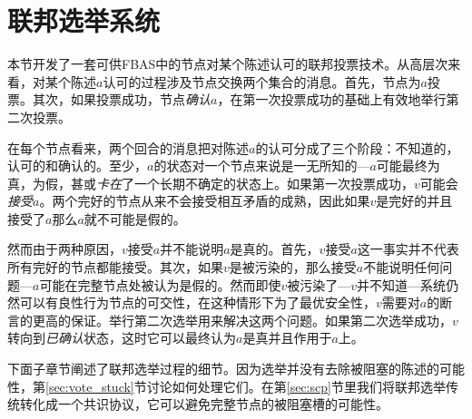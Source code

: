 \section{联邦选举系统}\label{sec:fba}

本节开发了一套可供FBAS中的节点对某个陈述认可的联邦投票技术。从高层次来看，对某个陈述$a$认可的过程涉及节点交换两个集合的消息。首先，节点为$a$投票。其次，如果投票成功，节点\textit{确认}$a$，在第一次投票成功的基础上有效地举行第二次投票。

在每个节点看来，两个回合的消息把对陈述$a$的认可分成了三个阶段：不知道的，认可的和确认的。至少，$a$的状态对一个节点来说是一无所知的---$a$可能最终为真，为假，甚或\textit{卡在}了一个长期不确定的状态上。如果第一次投票成功，$v$可能会\textit{接受}$a$。两个完好的节点从来不会接受相互矛盾的成熟，因此如果$v$是完好的并且接受了$a$那么$a$就不可能是假的。

然而由于两种原因，$v$接受$a$并不能说明$a$是真的。首先，$v$接受$a$这一事实并不代表所有完好的节点都能接受。其次，如果$v$是被污染的，那么接受$a$不能说明任何问题---$a$可能在完整节点处被认为是假的。然而即使$v$被污染了---$v$并不知道---系统仍然可以有良性行为节点的{\quorum}可交性，在这种情形下为了最优安全性，$v$需要对$a$的断言的更高的保证。举行第二次选举用来解决这两个问题。如果第二次选举成功，$v$转向到\textit{已确认}状态，这时它可以最终认为$a$是真并且作用于$a$上。

下面子章节阐述了联邦选举过程的细节。因为选举并没有去除被阻塞的陈述的可能性，第\ref{sec:vote_stuck}节讨论如何处理它们。在第\ref{sec:scp}节里我们将联邦选举传统转化成一个共识协议，它可以避免完整节点的被阻塞槽的可能性。






